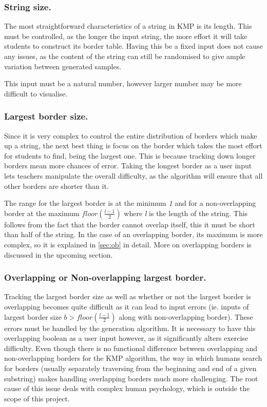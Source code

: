 \documentclass{l4proj}
\begin{document}
\subsubsection{String size.}

The most straightforward characteristics of a string in KMP is its length. This must be controlled, as the longer the input string, the more effort it will take students to construct its border table. Having this be a fixed input does not cause any issues, as the content of the string can still be randomised to give ample variation between generated samples.

This input must be a natural number, however larger number may be more difficult to visualise.

\subsubsection{Largest border size.}

Since it is very complex to control the entire distribution of borders which make up a string, the next best thing is focus on the border which takes the most effort for students to find, being the largest one. This is because tracking down longer borders mean more chances of error. Taking the longest border as a user input lets teachers manipulate the overall difficulty, as the algorithm will ensure that all other borders are shorter than it.

The range for the largest border is at the minimum \emph{1} and for a non-overlapping border at the maximum $floor(\frac{l-1}{2})$ where \emph{l} is the length of the string. This follows from the fact that the border cannot overlap itself, this it must be short than half of the string. In the case of an overlapping border, its maximum is more complex, so it is explained in \autoref{sec:ob} in detail. More on overlapping borders is discussed in the upcoming section.

\subsubsection{Overlapping or Non-overlapping largest border.}

Tracking the largest border size as well as whether or not the largest border is overlapping becomes quite difficult as it can lead to input errors (ie. inputs of largest border size $b > floor(\frac{l-1}{2})$ along with non-overlapping border). These errors must be handled by the generation algorithm. It is necessary to have this overlapping boolean as a user input however, as it significantly alters exercise difficulty. Even though there is no functional difference between overlapping and non-overlapping borders for the KMP algorithm, the way in which humans search for borders (usually separately traversing from the beginning and end of a given substring) makes handling overlapping borders much more challenging. The root cause of this issue deals with complex human psychology, which is outside the scope of this project. \cite{a}
\end{document}
